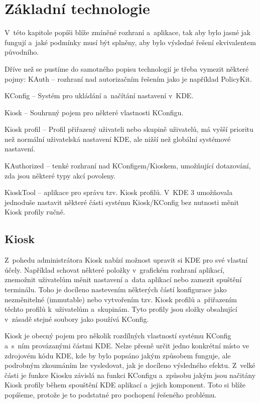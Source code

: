 \chapter{Základní technologie}
V~této kapitole popíši blíže zmíněné rozhraní a~aplikace, tak aby bylo jasné
jak fungují a~jaké podmínky musí být splněny, aby bylo výsledné řešení
ekvivalentem původního.

Dříve než se pustíme do samotného popisu technologií je třeba vymezit některé pojmy:
KAuth -- rozhraní nad autorizačním řešením jako je například PolicyKit.

KConfig -- Systém pro ukládání a~načítání nastavení v~KDE.

Kiosk -- Souhrnný pojem pro některé vlastnosti KConfigu.

Kiosk profil -- Profil přiřazený uživateli nebo skupině uživatelů, má vyšší prioritu
než normální uživatelská nastavení KDE, ale nižší než globální systémové nastavení.

KAuthorized -- tenké rozhraní nad KConfigem/Kioskem, umožňující dotazování, zda
jsou některé typy akcí povoleny.

KioskTool -- aplikace pro správu tzv. Kiosk profilů. V~KDE 3 umožňovala jednoduše
nastavit některé části systému Kiosk/KConfig bez nutnosti měnit Kiosk profily ručně.

\section{Kiosk}
Z~pohedu administrátora Kiosk nabízí možnost upravit si KDE pro své vlastní
účely. Například schovat některé položky v~grafickém rozhraní aplikací,
znemožnit uživatelům měnit nastavení a~data aplikací nebo zamezit spuštění
terminálu. Toho je docíleno nastevením některých částí konfigurace jako
nezměnitelné (immutable) nebo vytvořením tzv. Kiosk profilů a~přiřazením těchto
profilů k~uživatelům a~skupinám. Tyto profily jsou složky obsahující v~zásadě
stejné soubory jako používá KConfig.

Kiosk je obecný pojem pro několik rozdílných vlastností systému KConfig a~s~ním
provázanými částmi KDE. Nelze přesně určit jedno konkrétní místo ve zdrojovém kódu
KDE, kde by bylo popsáno jakým způsobem funguje, ale podrobným zkoumáním lze vysledovat,
jak je docíleno výsledného efektu. Z~velké části je funkce Kiosku závislá na funkci
KConfigu a~způsobu jakým jsou načitány Kiosk profily během spouštění KDE aplikací
a~jejich komponent. Toto si blíže popíšeme, protože je to podstatné pro pochopení
řešeného problému.


